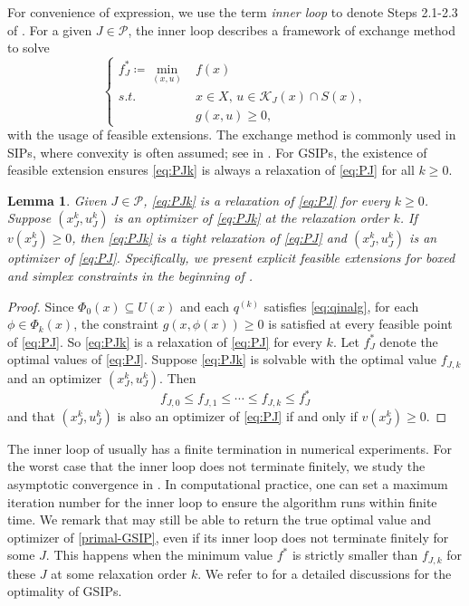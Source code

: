 \documentclass{amsart}
\theoremstyle{plain}
\newtheorem{lemma}[theorem]{Lemma}
\newcommand{\st}{\mathit{s.t.}}
\newcommand{\mc}[1]{\mathcal{#1}}
\numberwithin{equation}{section}
\begin{document}
		For convenience of expression, we use the term \emph{inner loop} 
		to denote Steps 2.1-2.3 of .
		For a given $J\in \mc{P}$, the inner loop describes a framework of 
		exchange method to solve 
		\begin{equation}\label{eq:PJ}
			\left\{\begin{array}{rl}
				f_J^*\coloneqq \min\limits_{(x,u)} & f(x)\\
				\st & x\in X,\, u\in \mc{K}_J(x)\cap S(x),\\
				& g(x,u)\ge 0,
			\end{array}
			\right.
		\end{equation}
		with the usage of feasible extensions.  
		The exchange method is commonly used in SIPs, where convexity is often assumed; 
		see in \cite{BhattachCP76,Cerulli22,Still2001}.
		For GSIPs, the existence of feasible extension ensures \eqref{eq:PJk} 
		is always a relaxation of \eqref{eq:PJ} for all $k\ge 0$.
		\begin{lemma}\label{lem:PJ}
		Given $J\in\mc{P}$, \eqref{eq:PJk} is a relaxation of \eqref{eq:PJ} for every $k\ge 0$. 
		Suppose $(x_J^k, u_J^{k})$ is an optimizer of \eqref{eq:PJk} at the relaxation order $k$. 
		If $v(x_J^k)\ge 0$, then \eqref{eq:PJk} is a tight relaxation of \eqref{eq:PJ}
		and $(x_J^k, u_J^k)$ is an optimizer of \eqref{eq:PJ}.			
		Specifically, we present explicit feasible extensions for boxed and simplex
		constraints in the beginning of .
		\end{lemma}
		\begin{proof}
			Since $\Phi_0(x)\subseteq U(x)$ and each $q^{(k)}$ satisfies \eqref{eq:qinalg},
			for each $\phi\in \Phi_k(x)$, the constraint $g(x, \phi(x))\ge 0$ is satisfied
			at every feasible point of \eqref{eq:PJ}.
			So \eqref{eq:PJk} is a relaxation of \eqref{eq:PJ} for every $k$.
			Let $f_J^*$ denote the optimal values of \eqref{eq:PJ}.
			Suppose \eqref{eq:PJk} is solvable with the optimal value $f_{J,k}$ and an 
			optimizer $(x_J^k, u_J^k)$. Then
			\[
			f_{J,0}\le f_{J,1}\le \cdots\le f_{J,k}\le f_J^*
			\]
			and that $(x_J^k, u_J^k)$ is also an optimizer of \eqref{eq:PJ}
			if and only if $v(x_J^k)\ge 0$.
		\end{proof}
		The inner loop of  usually has a finite termination
		in numerical experiments.
		For the worst case that the inner loop does not terminate finitely, 
		we study the asymptotic convergence in .
		In computational practice, one can set a maximum iteration number for the inner loop to ensure the algorithm runs within finite time.
		We remark that  may still be able to return the true optimal 
		value and optimizer of \eqref{primal-GSIP}, 
		even if its inner loop does not terminate finitely for some $J$.
		This happens when the minimum value $f^*$ is strictly smaller than 
		$f_{J,k}$ for these $J$ at some relaxation order $k$.
		We refer to  for a detailed discussions for the optimality of GSIPs.
		
\end{document}
